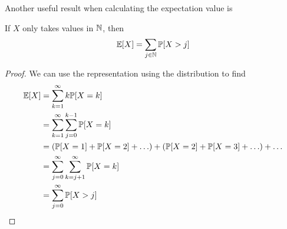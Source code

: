 Another useful result when calculating the expectation value is
\begin{lem}[]
If $X$ only takes values in $\mathbb{N}$, then
\begin{align*}
  \mathbb{E}[X]= \sum_{j \in \mathbb{N}} \mathbb{P}[X > j]
\end{align*}
\end{lem}
\begin{proof}
  We can use the representation using the distribution to find
  \begin{align*}
    \mathbb{E}[X] &= \sum_{k=1}^{\infty} k \mathbb{P}[X = k]\\
    &= \sum_{k=1}^{\infty}\sum_{j=0}^{k-1}\mathbb{P}[X = k]\\
    &= (\mathbb{P}[X=1] + \mathbb{P}[X=2] + \ldots) + (\mathbb{P}[X=2] + \mathbb{P}[X=3] + \ldots) + \ldots\\
    &= \sum_{j=0}^{\infty}\sum_{k=j+1}^{\infty}\mathbb{P}[X=k]\\
    &=\sum_{j=0}^{\infty} \mathbb{P}[X > j]
  \end{align*}
\end{proof}

